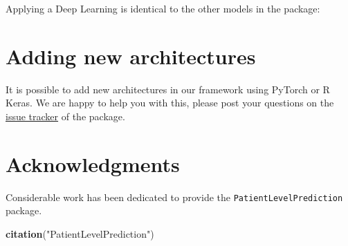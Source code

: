 \documentclass[
]{article}
\newenvironment{Shaded}{\begin{snugshade}}{\end{snugshade}}
\newcommand{\CommentTok}[1]{\textcolor[rgb]{0.56,0.35,0.01}{\textit{#1}}}
\newcommand{\KeywordTok}[1]{\textcolor[rgb]{0.13,0.29,0.53}{\textbf{#1}}}
\newcommand{\NormalTok}[1]{#1}
\newcommand{\OperatorTok}[1]{\textcolor[rgb]{0.81,0.36,0.00}{\textbf{#1}}}
\newcommand{\StringTok}[1]{\textcolor[rgb]{0.31,0.60,0.02}{#1}}
\begin{document}
Applying a Deep Learning is identical to the other models in the
package:

\begin{Shaded}
\end{Shaded}

\hypertarget{adding-new-architectures}{%
\section{Adding new architectures}\label{adding-new-architectures}}

It is possible to add new architectures in our framework using PyTorch
or R Keras. We are happy to help you with this, please post your
questions on the
\href{www.github.com/OHDSI/PatientLevelPrediction/issues}{issue tracker}
of the package.

\hypertarget{acknowledgments}{%
\section{Acknowledgments}\label{acknowledgments}}

Considerable work has been dedicated to provide the
\texttt{PatientLevelPrediction} package.

\begin{Shaded}
\begin{Highlighting}[]
\KeywordTok{citation}\NormalTok{(}\StringTok{"PatientLevelPrediction"}\NormalTok{)}
\end{Highlighting}
\end{Shaded}
\end{document}
